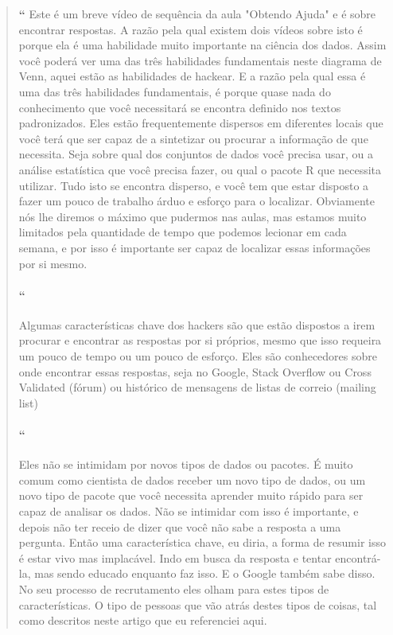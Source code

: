 \begin{quotation}%
\begin{small}
{\large\textbf{``}}%
Este é um breve vídeo de sequência da aula "Obtendo Ajuda" e é sobre encontrar respostas. A razão pela qual existem dois vídeos sobre isto é porque ela é uma habilidade muito importante na ciência dos dados. Assim você poderá ver uma das três habilidades fundamentais neste diagrama de Venn, aquei estão as habilidades de hackear. E a razão pela qual essa é uma das três habilidades fundamentais, é porque quase nada do conhecimento que você necessitará se encontra definido nos textos padronizados. Eles estão frequentemente dispersos em diferentes locais que você terá que ser capaz de a sintetizar ou procurar a informação de que necessita. Seja sobre qual dos conjuntos de dados você precisa usar, ou a análise estatística que você precisa fazer, ou qual o pacote R que necessita utilizar. Tudo isto se encontra disperso, e você tem que estar disposto a fazer um pouco de trabalho árduo e esforço para o localizar. Obviamente nós lhe diremos o máximo que pudermos nas aulas, mas estamos muito limitados pela quantidade de tempo que podemos lecionar em cada semana, e por isso é importante ser capaz de localizar essas informações por si mesmo. 

\paragraph{``}
Algumas características chave dos hackers são que estão dispostos a irem procurar e encontrar as respostas por si próprios, mesmo que isso requeira um pouco de tempo ou um pouco de esforço. Eles são conhecedores sobre onde encontrar essas respostas, seja no Google, Stack Overflow ou Cross Validated (fórum) ou histórico de mensagens de listas de correio (mailing list) 

\paragraph{``}
Eles não se intimidam por novos tipos de dados ou pacotes. É muito comum como cientista de dados receber um novo tipo de dados, ou um novo tipo de pacote que você necessita aprender muito rápido para ser capaz de analisar os dados. Não se intimidar com isso é importante, e depois não ter receio de dizer que você não sabe a resposta a uma pergunta. Então uma característica chave, eu diria,  a forma de resumir isso é estar vivo mas implacável. Indo em busca da resposta e tentar encontrá-la, mas sendo educado enquanto faz isso. E o Google também sabe disso. No seu processo de recrutamento eles olham para estes tipos de características. O tipo de pessoas que vão atrás destes tipos de coisas, tal como descritos neste artigo que eu referenciei aqui. 


\end{small}
\end{quotation}
